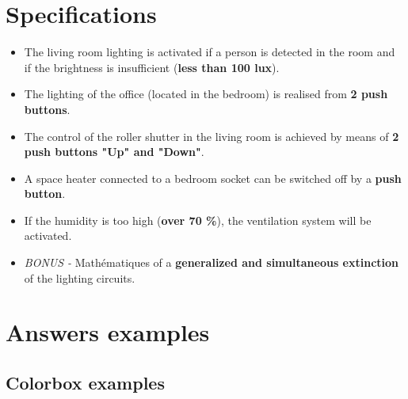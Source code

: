 
  \section{Specifications}

    \begin{vertAlign}
      \begin{itemize}[label=\color{green}]

        \Large
        \setlength\itemsep{0.8cm}


        \item The living room lighting is activated if a person is detected in the room and if the brightness is insufficient (\textbf{less than 100 lux}).

        \item The lighting of the office (located in the bedroom) is realised from \textbf{2 push buttons}.

        \item The control of the roller shutter in the living room is achieved by means of \textbf{2 push buttons "Up" and "Down"}.

        \item A space heater connected to a bedroom socket can be switched off by a \textbf{push button}.

        \item If the humidity is too high (\textbf{over 70 \%}), the ventilation system will be activated.

        \item[\color{red}\ding{56}] {\color{gray}\textit{BONUS -}} Mathématiques of a \textbf{generalized and simultaneous extinction} of the lighting circuits.
      \end{itemize}
    \end{vertAlign}

  
  \newpage

  \section{Answers examples}

    \subsection{Colorbox examples}

